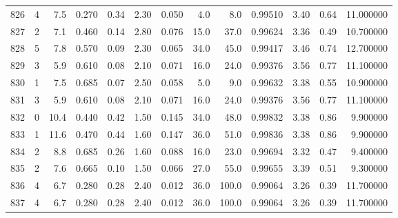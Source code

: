 \begin{tabular}{lrrrrrrrrrrrr}
826  &        4 &            7.5 &             0.270 &         0.34 &            2.30 &      0.050 &                  4.0 &                   8.0 &  0.99510 &  3.40 &       0.64 &  11.000000 \\
827  &        2 &            7.1 &             0.460 &         0.14 &            2.80 &      0.076 &                 15.0 &                  37.0 &  0.99624 &  3.36 &       0.49 &  10.700000 \\
828  &        5 &            7.8 &             0.570 &         0.09 &            2.30 &      0.065 &                 34.0 &                  45.0 &  0.99417 &  3.46 &       0.74 &  12.700000 \\
829  &        3 &            5.9 &             0.610 &         0.08 &            2.10 &      0.071 &                 16.0 &                  24.0 &  0.99376 &  3.56 &       0.77 &  11.100000 \\
830  &        1 &            7.5 &             0.685 &         0.07 &            2.50 &      0.058 &                  5.0 &                   9.0 &  0.99632 &  3.38 &       0.55 &  10.900000 \\
831  &        3 &            5.9 &             0.610 &         0.08 &            2.10 &      0.071 &                 16.0 &                  24.0 &  0.99376 &  3.56 &       0.77 &  11.100000 \\
832  &        0 &           10.4 &             0.440 &         0.42 &            1.50 &      0.145 &                 34.0 &                  48.0 &  0.99832 &  3.38 &       0.86 &   9.900000 \\
833  &        1 &           11.6 &             0.470 &         0.44 &            1.60 &      0.147 &                 36.0 &                  51.0 &  0.99836 &  3.38 &       0.86 &   9.900000 \\
834  &        2 &            8.8 &             0.685 &         0.26 &            1.60 &      0.088 &                 16.0 &                  23.0 &  0.99694 &  3.32 &       0.47 &   9.400000 \\
835  &        2 &            7.6 &             0.665 &         0.10 &            1.50 &      0.066 &                 27.0 &                  55.0 &  0.99655 &  3.39 &       0.51 &   9.300000 \\
836  &        4 &            6.7 &             0.280 &         0.28 &            2.40 &      0.012 &                 36.0 &                 100.0 &  0.99064 &  3.26 &       0.39 &  11.700000 \\
837  &        4 &            6.7 &             0.280 &         0.28 &            2.40 &      0.012 &                 36.0 &                 100.0 &  0.99064 &  3.26 &       0.39 &  11.700000 \\

\end{tabular}
